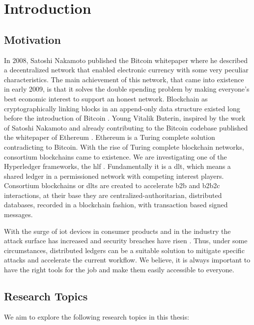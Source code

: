 \chapter{Introduction}

\section{Motivation} %

In 2008, Satoshi Nakamoto published the Bitcoin whitepaper\cite{nakamoto2008bitcoin} where he described a decentralized network that enabled electronic currency with some very peculiar characteristics. The main achievement of this network, that came into existence in early 2009, is that it solves the double spending problem by making everyone's best economic interest to support an honest network. Blockchain as cryptographically linking blocks in an append-only data structure existed long before the introduction of Bitcoin \cite{haber1990time}. Young Vitalik Buterin, inspired by the work of Satoshi Nakamoto and already contributing to the Bitcoin codebase published the whitepaper of Ethereum \cite{buterin2013ethereum}. Ethereum is a Turing complete solution contradicting to Bitcoin. With the rise of Turing complete blockchain networks, consortium blockchains came to existence. We are investigating one of the Hyperledger frameworks, the \acrlong{hlf} \cite{androulaki2018hyperledger}. Fundamentally it is a \acrfull{dlt}, which means a shared ledger in a permissioned network with competing interest players. Consortium blockchains or \acrshort{dlt}s are created to accelerate \acrshort{b2b} and \acrshort{b2b2c} interactions, at their base they are centralized-authoritarian, distributed databases, recorded in a blockchain fashion, with transaction based signed messages. 

With the surge of \acrfull{iot} devices in consumer products and in the industry the attack surface has increased and security breaches have risen \cite{gemalto-iot}. Thus, under some circumstances, distributed ledgers can be a suitable solution to mitigate specific attacks and accelerate the current workflow. We believe, it is always important to have the right tools for the job and make them easily accessible to everyone.

\section{Research Topics}
We aim to explore the following research topics in this thesis:

